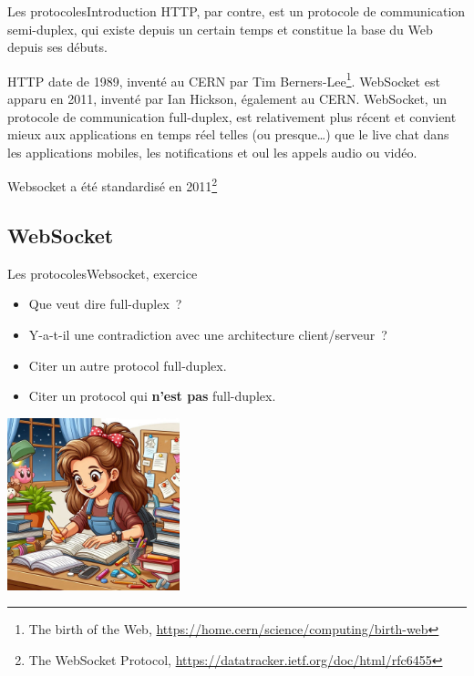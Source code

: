 \documentclass{beamer}
\begin{document}
    \begin{frame}{Les protocoles}{Introduction\label{sendbird-protocole}}
        HTTP, par contre, est un protocole de communication semi-duplex, qui existe depuis un certain temps et constitue la base du Web depuis ses débuts.

        HTTP date de 1989, inventé au CERN par Tim Berners-Lee\footnote{The birth of the Web, \url{https://home.cern/science/computing/birth-web}}. WebSocket est apparu en 2011, inventé par Ian Hickson, également au CERN.
        \bigbreak
        WebSocket, un protocole de communication full-duplex, est relativement plus récent et convient mieux aux applications en temps réel telles (ou presque\ldots) que le live chat dans les applications mobiles, les notifications et oul les appels audio ou vidéo.

        Websocket a été standardisé en 2011\footnote{The WebSocket Protocol, \url{https://datatracker.ietf.org/doc/html/rfc6455}}
    \end{frame}

    \subsection{WebSocket}\label{subsec:websocket}

    \begin{frame}{Les protocoles}{Websocket, exercice \execcounterdispinc}
        \begin{itemize}
            \item Que veut dire full-duplex~?
            \item Y-a-t-il une contradiction avec une architecture client/serveur~?
            \item Citer un autre protocol full-duplex.
            \item Citer un protocol qui \textbf{n'est pas} full-duplex.
        \end{itemize}
        \bigbreak
        \centering
        \includegraphics[width=5cm]{image/homework}
    \end{frame}
\end{document}
